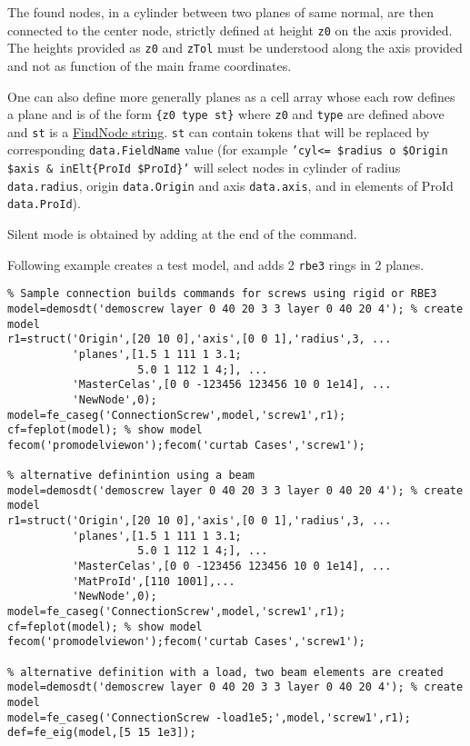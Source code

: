 \begin{SDT}
The found nodes, in a cylinder between two planes of same normal, are then connected to the center node, strictly defined at height {\tt z0} on the axis provided. The heights provided as {\tt z0} and {\tt zTol} must be understood along the axis provided and not as function of the main frame coordinates.

One can also define more generally planes as a cell array whose each row defines a plane and is of the form {\tt \{z0 type st\}} where {\tt z0} and {\tt type} are defined above and {\tt st} is a \hyperlink{findnode}{FindNode string}. {\tt st} can contain  tokens that will be replaced by corresponding {\tt data.FieldName} value (for example {\tt 'cyl<= \$radius o \$Origin \$axis \& inElt\{ProId \$ProId\}'} will select nodes in cylinder of radius {\tt data.radius}, origin {\tt data.Origin} and axis {\tt data.axis}, and in elements of ProId {\tt data.ProId}).

Silent mode is obtained by adding \ts{;} at the end of the command.

Following example creates a test model, and adds 2 {\tt rbe3} rings in 2 planes.

\begin{verbatim}
% Sample connection builds commands for screws using rigid or RBE3
model=demosdt('demoscrew layer 0 40 20 3 3 layer 0 40 20 4'); % create model
r1=struct('Origin',[20 10 0],'axis',[0 0 1],'radius',3, ...
          'planes',[1.5 1 111 1 3.1;
                    5.0 1 112 1 4;], ...
          'MasterCelas',[0 0 -123456 123456 10 0 1e14], ...
          'NewNode',0);
model=fe_caseg('ConnectionScrew',model,'screw1',r1);
cf=feplot(model); % show model 
fecom('promodelviewon');fecom('curtab Cases','screw1');

% alternative definintion using a beam
model=demosdt('demoscrew layer 0 40 20 3 3 layer 0 40 20 4'); % create model
r1=struct('Origin',[20 10 0],'axis',[0 0 1],'radius',3, ...
          'planes',[1.5 1 111 1 3.1;
                    5.0 1 112 1 4;], ...
          'MasterCelas',[0 0 -123456 123456 10 0 1e14], ...
          'MatProId',[110 1001],...
          'NewNode',0);
model=fe_caseg('ConnectionScrew',model,'screw1',r1);
cf=feplot(model); % show model 
fecom('promodelviewon');fecom('curtab Cases','screw1');

% alternative definition with a load, two beam elements are created
model=demosdt('demoscrew layer 0 40 20 3 3 layer 0 40 20 4'); % create model
model=fe_caseg('ConnectionScrew -load1e5;',model,'screw1',r1);
def=fe_eig(model,[5 15 1e3]);


\end{verbatim}
\end{SDT}
